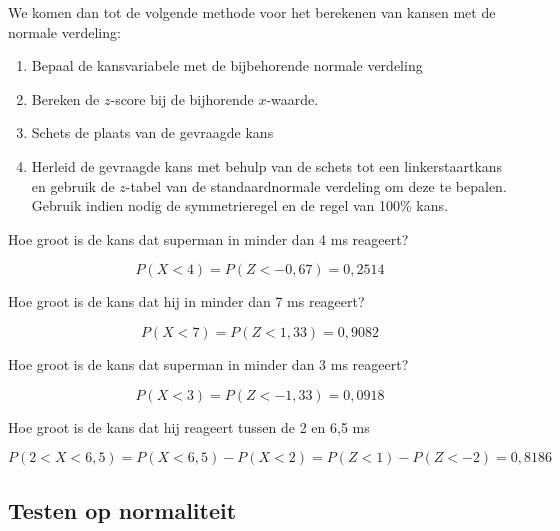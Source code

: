 {We komen dan tot de volgende methode voor het berekenen van kansen met de normale verdeling:
\begin{enumerate}
  \item Bepaal de kansvariabele met de bijbehorende normale verdeling
  \item Bereken de $z$-score bij de bijhorende $x$-waarde.
  \item Schets de plaats van de gevraagde kans
  \item Herleid de gevraagde kans met behulp van de schets tot een linkerstaartkans en gebruik de $z$-tabel van de standaardnormale verdeling om deze te bepalen. Gebruik indien nodig de symmetrieregel en de regel van 100\% kans.
\end{enumerate}

\begin{exercise}
Hoe groot is de kans dat superman in minder dan 4 ms reageert?
\end{exercise}

\[ P(X < 4) = P(Z < -0,67) = 0,2514 \]

\begin{exercise}
Hoe groot is de kans dat hij in minder dan 7 ms reageert?
\end{exercise}

\[ P(X < 7) = P(Z < 1,33) = 0,9082 \]

\begin{exercise}
Hoe groot is de kans dat superman in minder dan 3 ms reageert?
\end{exercise}

\[ P(X<3) = P(Z < -1,33) = 0,0918 \]

\begin{exercise}
Hoe groot is de kans dat hij reageert tussen de 2 en 6,5 ms
\end{exercise}

\[ P( 2 < X < 6,5) = P(X<6,5) - P(X<2) = P(Z<1) - P(Z<-2) = 0,8186 \]

\subsection{Testen op normaliteit}

}
